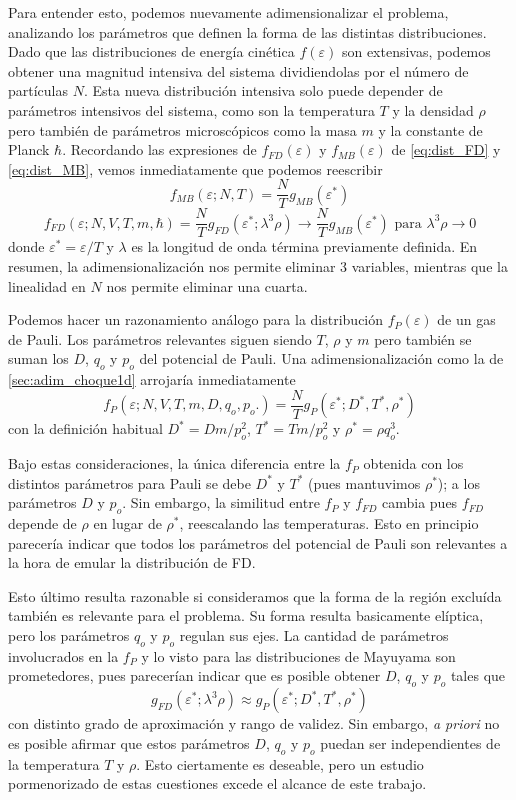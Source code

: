 Para entender esto, podemos nuevamente adimensionalizar el problema, analizando los parámetros que definen la forma de las distintas distribuciones.
Dado que las distribuciones de energía cinética $f(\varepsilon)$ son extensivas, podemos obtener una magnitud intensiva del sistema dividiendolas por el número de partículas $N$.
Esta nueva distribución intensiva solo puede depender de parámetros intensivos del sistema, como son la temperatura $T$ y la densidad $\rho$ pero también de parámetros microscópicos como
la masa $m$ y la constante de Planck $\hbar$.
Recordando las expresiones de $f_{FD}(\varepsilon)$ y $f_{MB}(\varepsilon)$ de \eqref{eq:dist_FD} y \eqref{eq:dist_MB}, vemos inmediatamente que podemos reescribir
\[ f_{MB}(\varepsilon;N,T) = \frac{N}{T}g_{MB}(\varepsilon^*) \]
\[ f_{FD}(\varepsilon;N, V, T, m, \hbar) = \frac{N}{T}g_{FD}(\varepsilon^*;\lambda^3\rho) \to \frac{N}{T}g_{MB}(\varepsilon^*) \text{ para } \lambda^3\rho\to0 \]
donde $\varepsilon^* = \varepsilon/T$ y $\lambda$ es la longitud de onda términa previamente definida.
En resumen, la adimensionalización nos permite eliminar 3 variables, mientras que la linealidad en $N$ nos permite eliminar una cuarta.

Podemos hacer un razonamiento análogo para la distribución $f_P(\varepsilon)$ de un gas de Pauli.
Los parámetros relevantes siguen siendo $T$, $\rho$ y $m$ pero también se suman los $D$, $q_o$ y $p_o$ del potencial de Pauli.
Una adimensionalización como la de \ref{sec:adim_choque1d} arrojaría inmediatamente 
\[ f_P(\varepsilon; N,V,T, m, D, q_o,p_o.) = \frac{N}{T}g_P(\varepsilon^*; D^*, T^*, \rho^*)\]
con la definición habitual $D^*=Dm/p_o^2$, $T^*=Tm/p_o^2$ y $\rho^* = \rho q_o^3$.

Bajo estas consideraciones, la única diferencia entre la $f_P$ obtenida con los distintos parámetros para Pauli se debe $D^*$ y $T^*$ (pues mantuvimos $\rho^*$); a los parámetros $D$ y $p_o$.
Sin embargo, la similitud entre $f_P$ y $f_{FD}$ cambia pues $f_{FD}$ depende de $\rho$ en lugar de $\rho^*$, reescalando las temperaturas.
Esto en principio parecería indicar que todos los parámetros del potencial de Pauli son relevantes a la hora de emular la distribución de FD.

Esto último resulta razonable si consideramos que la forma de la región excluída también es relevante para el problema.
Su forma resulta basicamente elíptica, pero los parámetros $q_o$ y $p_o$ regulan sus ejes.
La cantidad de parámetros involucrados en la $f_P$ y lo visto para las distribuciones de Mayuyama son prometedores, pues parecerían indicar que es posible obtener $D$, $q_o$ y $p_o$ tales que
\[ g_{FD}(\varepsilon^*;\lambda^3\rho) \approx g_P(\varepsilon^*; D^*, T^*, \rho^*) \]
con distinto grado de aproximación y rango de validez. 
Sin embargo, \textit{a priori} no es posible afirmar que estos parámetros $D$, $q_o$ y $p_o$ puedan ser independientes de la temperatura $T$ y $\rho$.
Esto ciertamente es deseable, pero un estudio pormenorizado de estas cuestiones excede el alcance de este trabajo.

